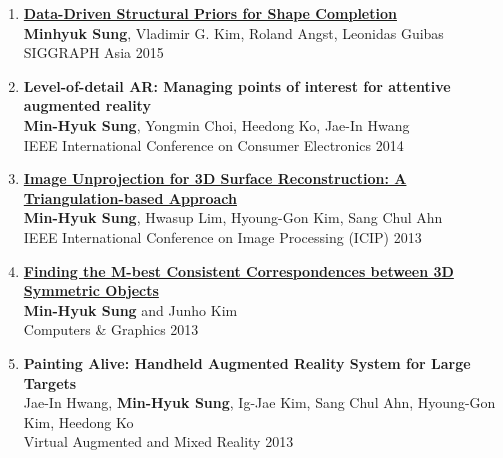 \documentclass[letterpaper,10pt]{article} %
\newcommand{\blankline}{\quad\pagebreak[2]}
\begin{document}
{\begin{enumerate}
\item \label{siggraphasia15}
\href{https://mhsung.github.io/structure-completion.html}{\textbf{Data-Driven Structural Priors for Shape Completion}}\\
\textbf{Minhyuk Sung}, Vladimir G. Kim, Roland Angst, Leonidas Guibas\\
SIGGRAPH Asia 2015\\
\blankline

\item \label{icce14}
\textbf{Level-of-detail AR: Managing points of interest for attentive augmented reality}\\
\textbf{Min-Hyuk Sung}, Yongmin Choi, Heedong Ko, Jae-In Hwang\\
IEEE International Conference on Consumer Electronics 2014\\
\blankline

\item \label{icip13}
\href{http://dx.doi.org/10.1109/icip.2013.6738034}{\textbf{Image Unprojection for 3D Surface Reconstruction: A Triangulation-based Approach}}\\
\textbf{Min-Hyuk Sung}, Hwasup Lim, Hyoung-Gon Kim, Sang Chul Ahn\\
IEEE International Conference on Image Processing (ICIP) 2013\\
\blankline

\item \label{cg13}
\href{http://dx.doi.org/10.1016/j.cag.2012.11.002}{\textbf{Finding the M-best Consistent Correspondences between 3D Symmetric Objects}} \\
\textbf{Min-Hyuk Sung} and Junho Kim\\
Computers \& Graphics 2013\\
\blankline

\item \label{vamr13}
\textbf{Painting Alive: Handheld Augmented Reality System for Large Targets} \\
Jae-In Hwang, \textbf{Min-Hyuk Sung}, Ig-Jae Kim, Sang Chul Ahn, Hyoung-Gon Kim, Heedong Ko\\
Virtual Augmented and Mixed Reality 2013\\
\blankline


\end{enumerate}}
\end{document}
